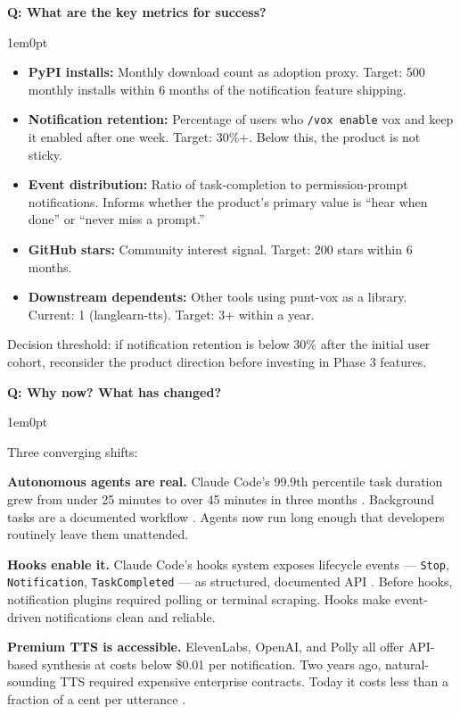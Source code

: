 \documentclass[11pt,letterpaper]{article}
\newcounter{faqnum}
\newenvironment{faqpair}[1]{%
  \needspace{4\baselineskip}%
  \vspace{0.5em}%
  \refstepcounter{faqnum}%
  \noindent\textbf{\color{SectionBlue}Q\thefaqnum: #1}\par\nopagebreak[4]%
  \vspace{0.2em}%
  \begin{adjustwidth}{1em}{0pt}%
  \setlength{\parindent}{0pt}%
}{%
  \end{adjustwidth}%
  \vspace{0.5em}%
}
\begin{document}
\begin{faqpair}{What are the key metrics for success?}\label{faq:metrics}
  \begin{itemize}[leftmargin=1.5em, nosep]
    \item \textbf{PyPI installs:} Monthly download count as adoption proxy.
          Target: 500 monthly installs within 6 months of the notification
          feature shipping.
    \item \textbf{Notification retention:} Percentage of users who
          \texttt{/vox enable} vox and keep it enabled after one week. Target:
          30\%+. Below this, the product is not sticky.
    \item \textbf{Event distribution:} Ratio of task-completion to
          permission-prompt notifications. Informs whether the product's
          primary value is ``hear when done'' or ``never miss a prompt.''
    \item \textbf{GitHub stars:} Community interest signal. Target: 200
          stars within 6 months.
    \item \textbf{Downstream dependents:} Other tools using punt-vox as a
          library. Current: 1 (langlearn-tts). Target: 3+ within a year.
  \end{itemize}

  Decision threshold: if notification retention is below 30\% after the
  initial user cohort, reconsider the product direction before investing in
  Phase 3 features.
\end{faqpair}

\begin{faqpair}{Why now? What has changed?}
  Three converging shifts:

  \textbf{Autonomous agents are real.} Claude Code's 99.9th percentile task
  duration grew from under 25 minutes to over 45 minutes in three months
  \cite{anthropic2026agentautonomy}. Background tasks are a documented
  workflow \cite{venturebeat2025claudetasks}. Agents now run long enough that
  developers routinely leave them unattended.

  \textbf{Hooks enable it.} Claude Code's hooks system exposes lifecycle
  events --- \texttt{Stop}, \texttt{Notification}, \texttt{TaskCompleted}
  --- as structured, documented API \cite{claudecodehooks2026}. Before hooks,
  notification plugins required polling or terminal scraping. Hooks make
  event-driven notifications clean and reliable.

  \textbf{Premium TTS is accessible.} ElevenLabs, OpenAI, and Polly all offer
  API-based synthesis at costs below \$0.01 per notification. Two years ago,
  natural-sounding TTS required expensive enterprise contracts. Today it costs
  less than a fraction of a cent per utterance
  \cite{texttolab2025pricing}.
\end{faqpair}
\end{document}
